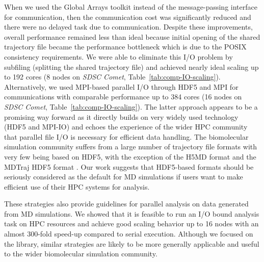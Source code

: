 When we used the Global Arrays toolkit instead of the message-passing interface for communication, then the communication cost was significantly reduced and there were no delayed task due to communication.
Despite these improvements, overall performance remained less than ideal because initial opening of the shared trajectory file became the performance bottleneck which is due to the POSIX consistency requirements.
We were able to eliminate this I/O problem by subfiling (splitting the shared trajectory file) and achieved nearly ideal scaling up to 192 cores (8 nodes on \emph{SDSC Comet}, Table~\ref{tab:comp-IO-scaling}).
Alternatively, we used MPI-based parallel I/O through HDF5 and MPI for communications with comparable performance up to 384 cores (16 nodes on \emph{SDSC Comet}, Table~\ref{tab:comp-IO-scaling}). 
The latter approach appears to be a promising way forward as it directly builds on very widely used technology (HDF5 and MPI-IO) and echoes the experience of the wider HPC community that parallel file I/O is necessary for efficient data handling.
The biomolecular simulation community suffers from a large number of trajectory file formats with very few being based on HDF5, with the exception of the H5MD format \cite{Buyl:2014aa} and the MDTraj HDF5 format \cite{McGibbon:2015aa}.
Our work suggests that HDF5-based formats should be seriously considered as the default for MD simulations if users want to make efficient use of their HPC systems for analysis. 



%

These strategies also provide guidelines for parallel analysis on data generated from MD simulations.
We showed that it is feasible to run an I/O bound analysis task on HPC resources and achieve good scaling behavior up to 16 nodes with an almost 300-fold speed-up compared to serial execution.
Although we focused on the  library, similar strategies are likely to be more generally applicable and useful to the wider biomolecular simulation community.


